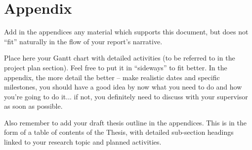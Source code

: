 \pagebreak
\section*{Appendix}

Add in the appendices any material which supports this document, but does not “fit” naturally in the flow of your report’s narrative.

Place here your Gantt chart with detailed activities (to be referred to in the project plan section). Feel free to put it in “sideways” to fit better. In the appendix, the more detail the better – make realistic dates and specific milestones, you should have a good idea by now what you need to do and how you’re going to do it... if not, you definitely need to discuss with your supervisor as soon as possible.

Also remember to add your draft thesis outline in the appendices. This is in the form of a table of contents of the Thesis, with detailed sub-section headings linked to your research topic and planned activities.

